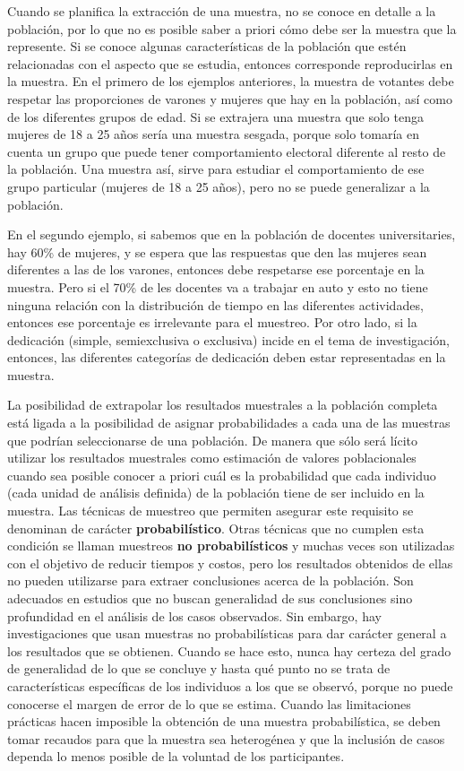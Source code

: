 \documentclass[]{book}
\begin{document}
Cuando se planifica la extracción de una muestra, no se conoce en
detalle a la población, por lo que no es posible saber a priori cómo
debe ser la muestra que la represente. Si se conoce algunas características de la población que estén relacionadas con el aspecto que se estudia, entonces corresponde reproducirlas en la muestra. En el primero de los ejemplos anteriores, la muestra de votantes debe respetar las proporciones de varones y mujeres que hay en la población, así como de los diferentes grupos de edad. Si se extrajera una muestra que solo tenga mujeres de 18 a 25 años sería una muestra sesgada, porque solo tomaría en cuenta un grupo que puede tener comportamiento electoral diferente al resto de la población. Una muestra así, sirve para estudiar el comportamiento de ese grupo particular (mujeres de 18 a 25 años), pero no se puede generalizar a la población.

En el segundo ejemplo, si sabemos que en la población de docentes universitaries, hay 60\% de mujeres, y se espera que las respuestas que den las mujeres sean diferentes a las de los varones, entonces debe respetarse ese porcentaje en la muestra. Pero si el 70\% de les docentes va a trabajar en auto y esto no tiene ninguna relación con la distribución de tiempo en las diferentes actividades, entonces ese porcentaje es irrelevante para el muestreo. Por otro lado, si la dedicación (simple, semiexclusiva o exclusiva) incide en el tema de
investigación, entonces, las diferentes categorías de dedicación deben estar representadas en la muestra.

La posibilidad de extrapolar los resultados muestrales a la población
completa está ligada a la posibilidad de asignar probabilidades a
cada una de las muestras que podrían seleccionarse de una población. De manera que sólo será lícito utilizar los resultados muestrales como
estimación de valores poblacionales cuando sea posible conocer a priori
cuál es la probabilidad que cada individuo (cada unidad de análisis definida) de la población tiene de ser
incluido en la muestra. Las técnicas de muestreo que permiten asegurar
este requisito se denominan de carácter \textbf{probabilístico}. Otras
técnicas que no cumplen esta condición se llaman muestreos \textbf{no probabilísticos} y muchas veces son utilizadas con el objetivo de
reducir tiempos y costos, pero los resultados obtenidos de ellas no
pueden utilizarse para extraer conclusiones acerca de la población. Son
adecuados en estudios que no buscan generalidad de sus conclusiones sino
profundidad en el análisis de los casos observados. Sin embargo, hay
investigaciones que usan muestras no probabilísticas para dar carácter
general a los resultados que se obtienen. Cuando se hace esto, nunca hay
certeza del grado de generalidad de lo que se concluye y hasta qué punto
no se trata de características específicas de los individuos a los que
se observó, porque no puede conocerse el margen de error de lo que se
estima. Cuando las limitaciones prácticas hacen imposible la obtención
de una muestra probabilística, se deben tomar recaudos para que la
muestra sea heterogénea y que la inclusión de casos dependa lo menos
posible de la voluntad de los participantes.
\end{document}
